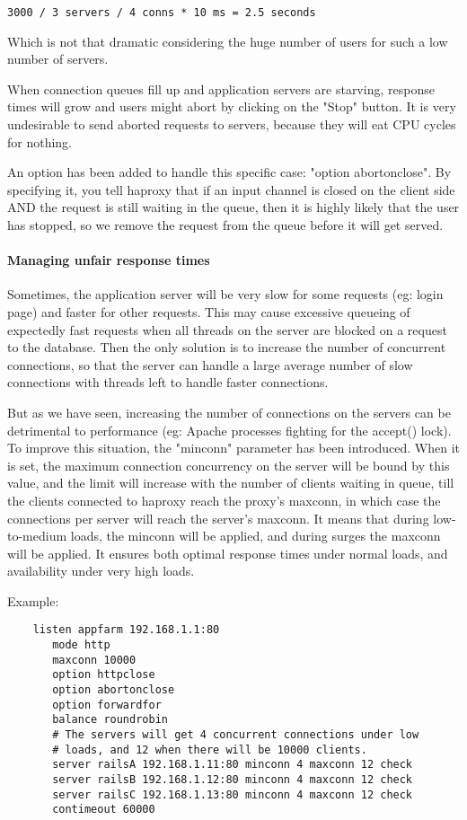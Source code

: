    \verb|3000 / 3 servers / 4 conns * 10 ms = 2.5 seconds|

Which is not that dramatic considering the huge number of users for such a low
number of servers.

When connection queues fill up and application servers are starving, response
times will grow and users might abort by clicking on the "Stop" button. It is
very undesirable to send aborted requests to servers, because they will eat
CPU cycles for nothing.

An option has been added to handle this specific case: "option abortonclose".
By specifying it, you tell haproxy that if an input channel is closed on the
client side AND the request is still waiting in the queue, then it is highly
likely that the user has stopped, so we remove the request from the queue
before it will get served.

\paragraph{Managing unfair response times}

Sometimes, the application server will be very slow for some requests (eg:
login page) and faster for other requests. This may cause excessive queueing
of expectedly fast requests when all threads on the server are blocked on a
request to the database. Then the only solution is to increase the number of
concurrent connections, so that the server can handle a large average number
of slow connections with threads left to handle faster connections.

But as we have seen, increasing the number of connections on the servers can
be detrimental to performance (eg: Apache processes fighting for the accept()
lock). To improve this situation, the "minconn" parameter has been introduced.
When it is set, the maximum connection concurrency on the server will be bound
by this value, and the limit will increase with the number of clients waiting
in queue, till the clients connected to haproxy reach the proxy's maxconn, in
which case the connections per server will reach the server's maxconn. It means
that during low-to-medium loads, the minconn will be applied, and during surges
the maxconn will be applied. It ensures both optimal response times under
normal loads, and availability under very high loads.

Example:

\begin{verbatim}
    listen appfarm 192.168.1.1:80
       mode http
       maxconn 10000
       option httpclose
       option abortonclose
       option forwardfor
       balance roundrobin
       # The servers will get 4 concurrent connections under low
       # loads, and 12 when there will be 10000 clients.
       server railsA 192.168.1.11:80 minconn 4 maxconn 12 check
       server railsB 192.168.1.12:80 minconn 4 maxconn 12 check
       server railsC 192.168.1.13:80 minconn 4 maxconn 12 check
       contimeout 60000
\end{verbatim}